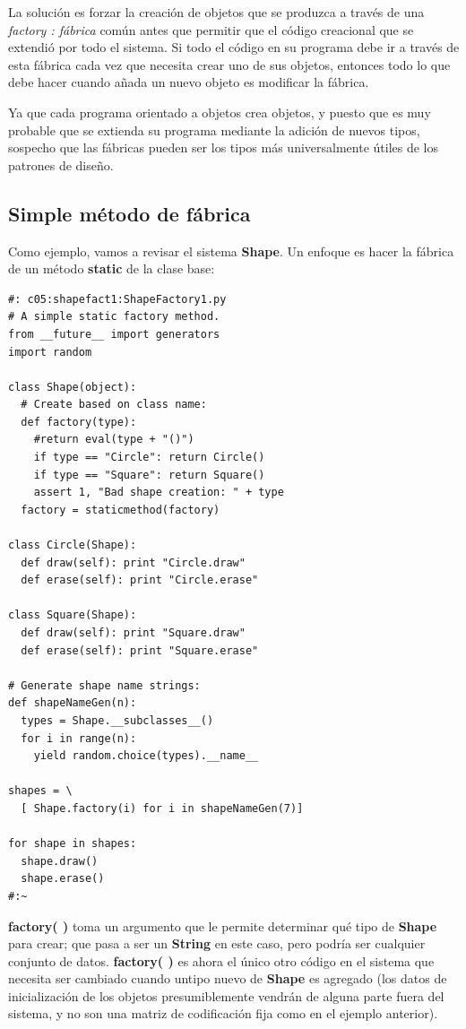 \documentclass{article}
\begin{document}
La solución es forzar la creación de objetos que se produzca a través de una \textit{factory : fábrica} común antes que permitir que el código creacional que se extendió por todo el sistema. Si todo el código en su programa debe ir a través de esta fábrica cada vez que necesita crear uno de sus objetos, entonces todo lo que debe hacer cuando añada un nuevo objeto es modificar la fábrica.   \newline

Ya que cada programa orientado a objetos crea objetos, y puesto que es muy probable que se extienda su programa mediante la adición de nuevos tipos, sospecho que las fábricas pueden ser los tipos más universalmente útiles de los patrones de diseño.  \newline

\subsection{Simple método de fábrica}

Como ejemplo, vamos a revisar el sistema \textbf{Shape}. 
Un enfoque es hacer la fábrica de un método \textbf{static} de la clase base:   \newline

\begin{lstlisting} 
#: c05:shapefact1:ShapeFactory1.py 
# A simple static factory method. 
from __future__ import generators 
import random 

class Shape(object): 
  # Create based on class name: 
  def factory(type): 
    #return eval(type + "()") 
    if type == "Circle": return Circle() 
    if type == "Square": return Square() 
    assert 1, "Bad shape creation: " + type 
  factory = staticmethod(factory) 
  
class Circle(Shape): 
  def draw(self): print "Circle.draw"  
  def erase(self): print "Circle.erase"  
  
class Square(Shape): 
  def draw(self): print "Square.draw"  
  def erase(self): print "Square.erase"  
  
# Generate shape name strings: 
def shapeNameGen(n): 
  types = Shape.__subclasses__() 
  for i in range(n): 
    yield random.choice(types).__name__ 
    
shapes = \ 
  [ Shape.factory(i) for i in shapeNameGen(7)] 
  
for shape in shapes: 
  shape.draw() 
  shape.erase() 
#:~   
\end{lstlisting}

\textbf{factory( )} toma un argumento que le permite determinar qué tipo de \textbf{Shape} para crear; que pasa a ser un \textbf{String} en este caso, pero podría ser cualquier conjunto de datos.  \textbf{factory( )} es ahora el único otro código en el sistema que necesita ser cambiado cuando untipo nuevo de \textbf{Shape} es agregado (los datos de inicialización de los objetos presumiblemente vendrán de alguna parte fuera del sistema, y no son una matriz de codificación fija como en el ejemplo anterior).    \newline
\end{document}
